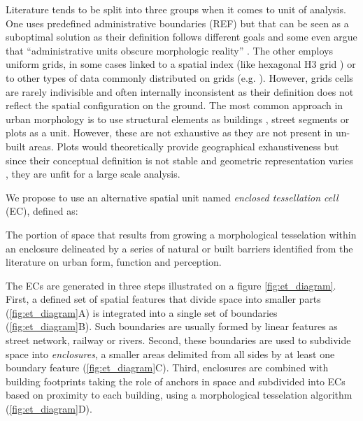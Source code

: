 Literature tends to be split into three groups when it comes to unit of analysis. One
uses predefined administrative boundaries (REF) but that can be seen as a suboptimal
solution as their definition follows different goals and some even argue that
“administrative units obscure morphologic reality” \citep{taubenbock2019new}. The other
employs uniform grids, in some cases linked to a spatial index (like hexagonal H3 grid
\citep{brodsky2018h3}) or to other types of data commonly distributed on grids (e.g.
\cite{jochem2020}). However, grids cells are rarely indivisible and often internally
inconsistent as their definition does not reflect the spatial configuration on the
ground. The most common approach in urban morphology is to use structural elements as
buildings \citep{hamaina2012a}, street segments \citep{araldi2019} or plots
\citep{berghauserpont2019a} as a unit. However, these are not exhaustive as they are not
present in un-built areas. Plots would theoretically provide geographical exhaustiveness
but since their conceptual definition is not stable and geometric representation varies
\citep{kropf2018plots}, they are unfit for a large scale analysis.

We propose to use an alternative spatial unit named \textit{enclosed tessellation cell}
(EC), defined as:

\begin{theorem}
    The portion of space that results from growing a morphological tesselation within an
enclosure delineated by a series of natural or built barriers identified from the
literature on urban form, function and perception.
\end{theorem}


The ECs are generated in three steps illustrated on a figure \ref{fig:et_diagram}.
First, a defined set of spatial features that divide space into smaller parts
(\ref{fig:et_diagram}A) is integrated into a single set of boundaries
(\ref{fig:et_diagram}B). Such boundaries are usually formed by linear features as street
network, railway or rivers. Second, these boundaries are used to subdivide space into
\textit{enclosures}, a smaller areas delimited from all sides by at least one boundary
feature (\ref{fig:et_diagram}C). Third, enclosures are combined with building footprints
taking the role of anchors in space and subdivided into ECs based on proximity to each
building, using a morphological tesselation algorithm
\citep{fleischmann2020morphological} (\ref{fig:et_diagram}D).

